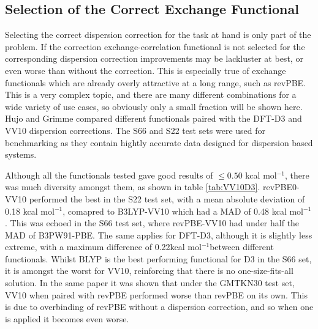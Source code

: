 \documentclass[10pt,a4paper,twocolumn,twoside]{extarticle}
\newcommand{\kcal}{kcal mol\(^{-1}\)}
\begin{document}


	\subsection{Selection of the Correct Exchange Functional}
	Selecting the correct dispersion correction for the task at hand is only part of the problem. If the correction exchange-correlation functional is not selected for the corresponding dispersion correction improvements may be lackluster at best, or even worse than without the correction. This is especially true of exchange functionals which are already overly attractive at a long range, such as revPBE. This is a very complex topic, and there are many different combinations for a wide variety of use cases, so obviously only a small fraction will be shown here. 
	Hujo and Grimme compared different functionals paired with the DFT-D3 and VV10 dispersion corrections.\cite{Grimme2011-D3-VV10-Compairons} The S66\cite{s66a,s66b} and S22\cite{s22} test sets were used for benchmarking as they contain hightly accurate data designed for dispersion based systems. 

	Although all the functionals tested gave good results of $\leq 0.50$ \kcal, there was much diversity amongst them, as shown in table \ref{tab:VV10D3}. revPBE0-VV10 performed the best in the S22 test set, with a mean absolute deviation of 0.18 \kcal, comapred to B3LYP-VV10 which had a MAD of 0.48 \kcal. This was echoed in the S66 test set, where revPBE-VV10 had under half the MAD of B3PW91-PBE. The same applies for DFT-D3, although it is slightly less extreme, with a maximum difference of 0.22\kcal between different functionals. Whilst BLYP is the best performing functional for D3 in the S66 set, it is amongst the worst for VV10, reinforcing that there is no one-size-fits-all solution.
	In the same paper it was shown that under the GMTKN30 test set, VV10 when paired with revPBE performed worse than revPBE on its own. This is due to overbinding of revPBE without a dispersion correction, and so when one is applied it becomes even worse. 
\end{document}
